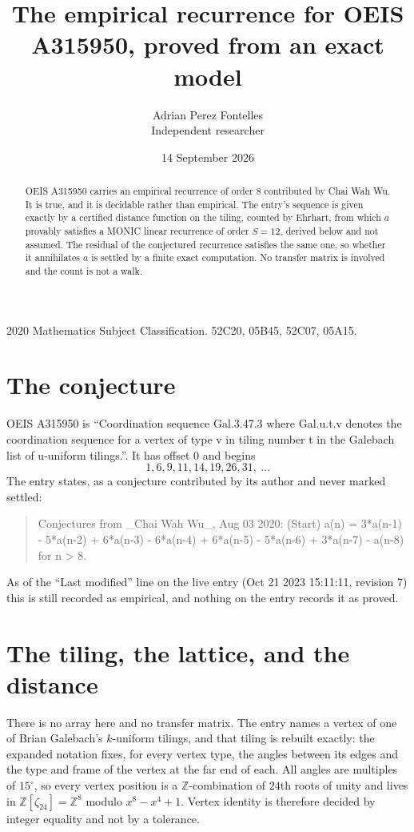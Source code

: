 \documentclass[11pt,a4paper]{article}
\title{The empirical recurrence for OEIS A315950, proved from an exact model}
\author{Adrian Perez Fontelles\\ \small Independent researcher}
\date{14 September 2026}
\theoremstyle{plain}
\theoremstyle{definition}
\begin{document}
\maketitle

\begin{abstract}
OEIS A315950 carries an empirical recurrence of order $8$ contributed by Chai Wah Wu. It is true, and it is
decidable rather than empirical. The entry's sequence is given exactly by a certified distance function on the tiling, counted by Ehrhart, from
which $a$ provably satisfies a MONIC linear recurrence of order $S=12$, derived below and not
assumed. The residual of the conjectured recurrence satisfies the same one, so whether it
annihilates $a$ is settled by a finite exact computation. No transfer matrix is involved and the count is not a walk.
\end{abstract}

\noindent\small 2020 Mathematics Subject Classification. 52C20, 05B45, 52C07, 05A15.\normalsize

\section{The conjecture}

OEIS A315950 is ``Coordination sequence Gal.3.47.3 where Gal.u.t.v denotes the coordination sequence for a vertex of type v in tiling number t in the Galebach list of u-uniform tilings.''. It has offset $0$ and begins
\[
1, 6, 9, 11, 14, 19, 26, 31,\ \dots
\]
The entry states, as a conjecture contributed by its author and never marked settled:
\begin{quote}
Conjectures from \_Chai Wah Wu\_, Aug 03 2020: (Start) a(n) = 3*a(n-1) - 5*a(n-2) + 6*a(n-3) - 6*a(n-4) + 6*a(n-5) - 5*a(n-6) + 3*a(n-7) - a(n-8) for n > 8.
\end{quote}
As of the ``Last modified'' line on the live entry (Oct 21 2023 15:11:11, revision 7)
this is still recorded as empirical, and nothing on the entry records it as proved.

\section{The tiling, the lattice, and the distance}

There is no array here and no transfer matrix. The entry names a vertex of one of Brian
Galebach's $k$-uniform tilings, and that tiling is rebuilt exactly: the expanded notation
fixes, for every vertex type, the angles between its edges and the type and frame of the
vertex at the far end of each. All angles are multiples of $15^\circ$, so every vertex
position is a $\mathbb{Z}$-combination of $24$th roots of unity and lives in
$\mathbb{Z}[\zeta_{24}]=\mathbb{Z}^{8}$ modulo $x^{8}-x^{4}+1$. Vertex identity is
therefore decided by integer equality and not by a tolerance.
\end{document}
